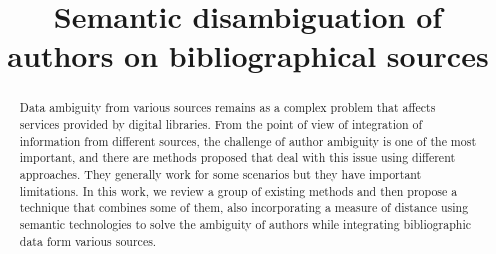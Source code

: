 \documentclass[conference]{IEEEtran}
\begin{document}
%
\title{Semantic disambiguation of authors on bibliographical sources}

% 
\author{
}

\maketitle


\begin{abstract}
Data ambiguity from various sources remains as a complex problem that affects services provided by digital libraries. From the point of view of integration of information from different sources, the challenge of author ambiguity is one of the most important, and there are methods proposed that deal with this issue using different approaches. They generally work for some scenarios but they have important limitations. In this work, we review a group of existing methods and then propose a technique that combines some of them, also incorporating a measure of distance using semantic technologies to solve the ambiguity of authors while integrating bibliographic data form various sources.
\end{abstract}

\IEEEpeerreviewmaketitle 
\end{document}

